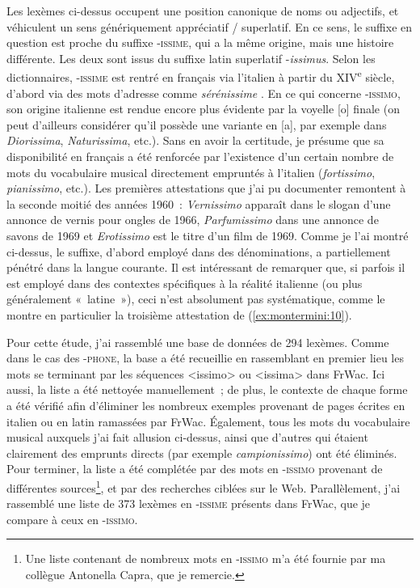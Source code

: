 \documentclass[output=paper]{langsci/langscibook}
\begin{document}
Les lexèmes ci-dessus occupent une position canonique de noms ou
adjectifs, et véhiculent un sens génériquement appréciatif / superlatif.
En ce sens, le suffixe en question est proche du suffixe
-\textsc{issime}, qui a la même origine, mais une histoire différente.
Les deux sont issus du suffixe latin superlatif -\emph{issimus}. Selon
les dictionnaires, -\textsc{issime} est rentré en français via l'italien
à partir du XIV\textsuperscript{e} siècle, d'abord via des mots
d'adresse comme \emph{sérénissime} %
\citep{Perko2010}%
%
. En ce qui concerne
-\textsc{issimo}, son origine italienne est rendue encore plus évidente
par la voyelle {[}o{]} finale (on peut d'ailleurs considérer qu'il
possède une variante en {[}a{]}, par exemple dans \emph{Diorissima},
\emph{Naturissima}, etc.). Sans en avoir la certitude, je présume que sa
disponibilité en français a été renforcée par l'existence d'un certain
nombre de mots du vocabulaire musical directement empruntés à l'italien
(\emph{fortissimo}, \emph{pianissimo}, etc.). Les premières attestations
que j'ai pu documenter remontent à la seconde moitié des années 1960~:
\emph{Vernissimo} apparaît dans le slogan d'une annonce de vernis pour
ongles de 1966, \emph{Parfumissimo} dans une annonce de savons de 1969
et \emph{Erotissimo} est le titre d'un film de 1969. Comme je l'ai
montré ci-dessus, le suffixe, d'abord employé dans des dénominations, a
partiellement pénétré dans la langue courante. Il est intéressant de
remarquer que, si parfois il est employé dans des contextes spécifiques
à la réalité italienne (ou plus généralement «~latine~»), ceci n'est
absolument pas systématique, comme le montre en particulier la troisième
attestation de (\ref{ex:montermini:10}).

Pour cette étude, j'ai rassemblé une base de données de 294 lexèmes.
Comme dans le cas des -\textsc{phone}, la base a été recueillie en
rassemblant en premier lieu les mots se terminant par les séquences
\textless{}issimo\textgreater{} ou \textless{}issima\textgreater{} dans
FrWac. Ici aussi, la liste a été nettoyée manuellement~; de plus, le
contexte de chaque forme a été vérifié afin d'éliminer les nombreux
exemples provenant de pages écrites en italien ou en latin ramassées par
FrWac. Également, tous les mots du vocabulaire musical auxquels j'ai
fait allusion ci-dessus, ainsi que d'autres qui étaient clairement des
emprunts directs (par exemple \emph{campionissimo}) ont été éliminés.
Pour terminer, la liste a été complétée par des mots en -\textsc{issimo}
provenant de différentes sources\footnote{Une liste contenant de
  nombreux mots en -\textsc{issimo} m'a été fournie par ma collègue
  Antonella Capra, que je remercie.}, et par des recherches ciblées sur
le Web. Parallèlement, j'ai rassemblé une liste de 373 lexèmes en
-\textsc{issime} présents dans FrWac, que je compare à ceux en
-\textsc{issimo}.
\end{document}
